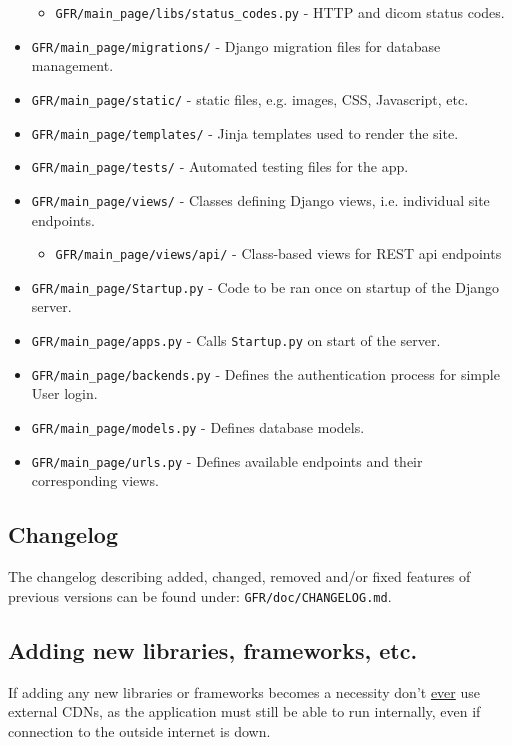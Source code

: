 \documentclass{article}
\begin{document}
\begin{itemize}
\begin{itemize}
		\item \texttt{GFR/main\_page/libs/status\_codes.py} - HTTP and dicom status codes.
	\end{itemize}
	\item \texttt{GFR/main\_page/migrations/} - Django migration files for database management.
	\item \texttt{GFR/main\_page/static/} - static files, e.g. images, CSS, Javascript, etc.
	\item \texttt{GFR/main\_page/templates/} - Jinja templates used to render the site.
	\item \texttt{GFR/main\_page/tests/} - Automated testing files for the app.
	\item \texttt{GFR/main\_page/views/} - Classes defining Django views, i.e. individual site endpoints.
	\begin{itemize}
		\item \texttt{GFR/main\_page/views/api/} - Class-based views for REST api endpoints
	\end{itemize}
	\item \texttt{GFR/main\_page/Startup.py} - Code to be ran once on startup of the Django server.
	\item \texttt{GFR/main\_page/apps.py} - Calls \texttt{Startup.py} on start of the server.
	\item \texttt{GFR/main\_page/backends.py} - Defines the authentication process for simple User login.
	\item \texttt{GFR/main\_page/models.py} - Defines database models.
	\item \texttt{GFR/main\_page/urls.py} - Defines available endpoints and their corresponding views.
\end{itemize}

\subsection{Changelog}
The changelog describing added, changed, removed and/or fixed features of previous versions can be found under: \texttt{GFR/doc/CHANGELOG.md}.

\subsection{Adding new libraries, frameworks, etc.}
If adding any new libraries or frameworks becomes a necessity don't \underline{ever} use external CDNs, as the application must still be able to run internally, even if connection to the outside internet is down.
\end{document}
